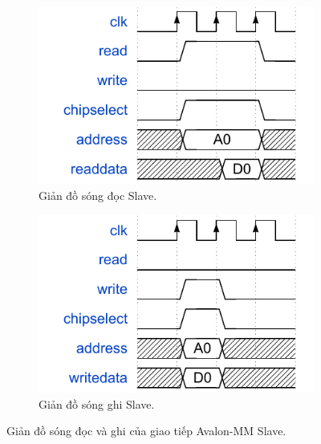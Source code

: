 \begin{enumerate}
    \begin{figure}[htbp]
        \centering
        \begin{subfigure}[b]{0.48\textwidth}
            \centering
            \includegraphics[width=\linewidth]{Images/02_03_AvalonSlave_ReadWaveform.pdf}
            \caption{Giản đồ sóng đọc Slave.}
            \label{fig:02_03_avalon_slave_read_sub}
        \end{subfigure}
        \hfill %
        \begin{subfigure}[b]{0.48\textwidth}
            \centering
            \includegraphics[width=\linewidth]{Images/02_04_AvalonSlave_WriteWaveform.pdf}
            \caption{Giản đồ sóng ghi Slave.}
            \label{fig:02_04_avalon_slave_write_sub}
        \end{subfigure}
        \caption{Giản đồ sóng đọc và ghi của giao tiếp Avalon-MM Slave.}
        \label{fig:avalon_slave_waveforms} %
    \end{figure}


\end{enumerate}
